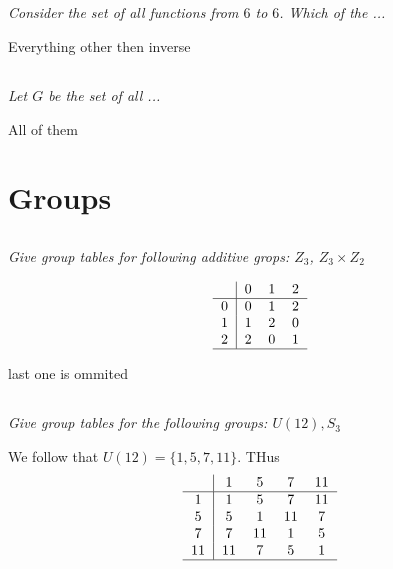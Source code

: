 \documentclass[11pt,oneside,titlepage]{book}
\newcommand{\set}[1]{\{ #1 \}}
\begin{document}
\subsection{}

\textit{Consider the set of all functions from $6$ to $6$. Which of the ...}

Everything other then inverse

\subsection{}

\textit{Let $G$ be the set of all ...}

All of them

\section{Groups}

\subsection{}

\textit{Give group tables for following additive grops: $Z_3$, $Z_3 \times Z_2$}

$$
\begin{tabular}{c | c c c}
   &  0 & 1 & 2 \\
  \hline
  0 & 0 & 1 & 2 \\
  1 & 1 & 2 & 0 \\
  2 & 2 & 0 & 1 \\
  \hline
\end{tabular}
$$

last one is ommited

\subsection{}

\textit{Give group tables for the following groups: $U(12), S_3$}

We follow that $U(12) = \set{1, 5, 7, 11}$. THus
$$
\begin{tabular}{c | c c c c}
   &  1 & 5 & 7 & 11 \\
  \hline
  1 & 1 & 5 & 7 & 11 \\
  5 & 5 & 1 & 11 & 7 \\
  7 & 7 & 11 & 1 & 5 \\
  11 & 11 & 7 & 5 & 1 \\
  \hline
\end{tabular}
$$
\end{document}
